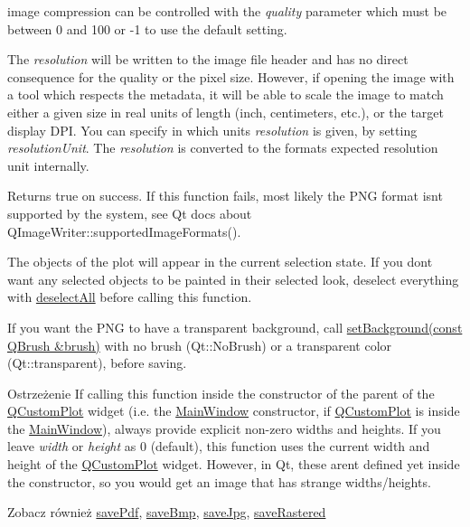 image compression can be controlled with the {\itshape quality} parameter which must be between 0 and 100 or -\/1 to use the default setting.

The {\itshape resolution} will be written to the image file header and has no direct consequence for the quality or the pixel size. However, if opening the image with a tool which respects the metadata, it will be able to scale the image to match either a given size in real units of length (inch, centimeters, etc.), or the target display D\+PI. You can specify in which units {\itshape resolution} is given, by setting {\itshape resolution\+Unit}. The {\itshape resolution} is converted to the format\textquotesingle{}s expected resolution unit internally.

Returns true on success. If this function fails, most likely the P\+NG format isn\textquotesingle{}t supported by the system, see Qt docs about Q\+Image\+Writer\+::supported\+Image\+Formats().

The objects of the plot will appear in the current selection state. If you don\textquotesingle{}t want any selected objects to be painted in their selected look, deselect everything with \hyperlink{class_q_custom_plot_a9d4808ab925b003054085246c92a257c}{deselect\+All} before calling this function.

If you want the P\+NG to have a transparent background, call \hyperlink{class_q_custom_plot_a8ed256cf467bfa7ba1f9feaae62c3bd0}{set\+Background(const Q\+Brush \&brush)} with no brush (Qt\+::\+No\+Brush) or a transparent color (Qt\+::transparent), before saving.

\begin{DoxyWarning}{Ostrzeżenie}
If calling this function inside the constructor of the parent of the \hyperlink{class_q_custom_plot}{Q\+Custom\+Plot} widget (i.\+e. the \hyperlink{class_main_window}{Main\+Window} constructor, if \hyperlink{class_q_custom_plot}{Q\+Custom\+Plot} is inside the \hyperlink{class_main_window}{Main\+Window}), always provide explicit non-\/zero widths and heights. If you leave {\itshape width} or {\itshape height} as 0 (default), this function uses the current width and height of the \hyperlink{class_q_custom_plot}{Q\+Custom\+Plot} widget. However, in Qt, these aren\textquotesingle{}t defined yet inside the constructor, so you would get an image that has strange widths/heights.
\end{DoxyWarning}
\begin{DoxySeeAlso}{Zobacz również}
\hyperlink{class_q_custom_plot_ad5acd34f6b39c3516887d7e54fec2412}{save\+Pdf}, \hyperlink{class_q_custom_plot_ae3a86ed0795670e50afa21759d4fa13d}{save\+Bmp}, \hyperlink{class_q_custom_plot_a76f0d278e630a711fa6f48048cfd83e4}{save\+Jpg}, \hyperlink{class_q_custom_plot_ad7723ce2edfa270632ef42b03a444352}{save\+Rastered} 
\end{DoxySeeAlso}
